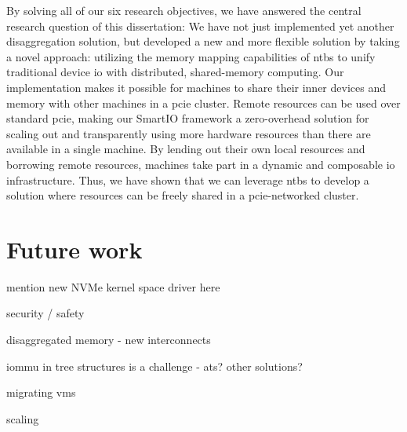 By solving all of our six research objectives, we have answered the central research question of this dissertation:
\researchquestion*%
We have not just implemented yet another \gls{disaggregation} solution, but developed a new and more flexible solution by taking a novel approach:
%
utilizing the memory mapping capabilities of \glspl{ntb} to unify traditional device \gls{io} with distributed, shared-memory computing.
%
Our implementation makes it possible for machines to share their inner devices and memory with other machines in a \gls{pcie} cluster.
%
Remote resources can be used over standard \gls{pcie}, making our SmartIO framework a zero-overhead solution for scaling out and transparently using more hardware resources than there are available in a single machine.
%
By lending out their own local resources and borrowing remote resources, machines take part in a dynamic and composable \gls{io} infrastructure.
%
Thus, we have shown that we can leverage \glspl{ntb} to develop a solution where resources can be freely shared in a \gls{pcie}-networked cluster.



\section{Future work}\label{sec:fw}
%
%

mention new NVMe kernel space driver here

security / safety

disaggregated memory - new interconnects

iommu in tree structures is a challenge - ats? other solutions?

migrating vms

scaling 



